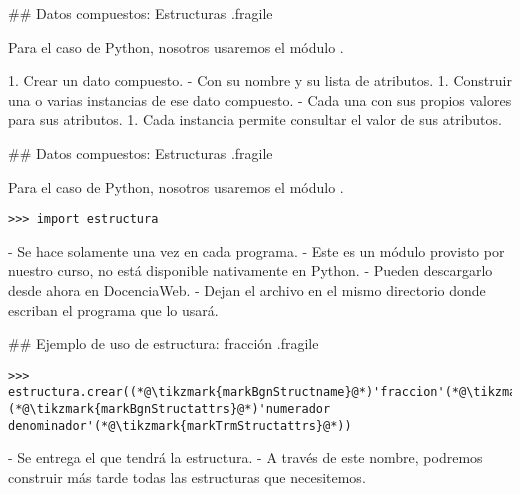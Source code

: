## Datos compuestos: Estructuras {.fragile}

\bgnblockidea
Para el caso de Python, nosotros usaremos el módulo .
\trmblockidea


1. Crear un dato compuesto.
    - Con su nombre y su lista de atributos.
1. Construir una o varias instancias de ese dato compuesto.
    - Cada una con sus propios valores para sus atributos.
1. Cada instancia permite consultar el valor de sus atributos.

## Datos compuestos: Estructuras {.fragile}

\bgnblockidea
Para el caso de Python, nosotros usaremos el módulo .
\trmblockidea


\begin{lstlisting}[style=frame02]
>>> import estructura
\end{lstlisting}

- Se hace solamente una vez en cada programa.
- Este es un módulo provisto por nuestro curso, no está disponible nativamente en Python.
- Pueden descargarlo desde ahora en DocenciaWeb.
- Dejan el archivo  en el mismo directorio donde escriban el programa que lo usará.

## Ejemplo de uso de estructura: fracción {.fragile}


\begin{lstlisting}
>>> estructura.crear((*@\tikzmark{markBgnStructname}@*)'fraccion'(*@\tikzmark{markTrmStructname}@*), (*@\tikzmark{markBgnStructattrs}@*)'numerador denominador'(*@\tikzmark{markTrmStructattrs}@*))
\end{lstlisting}


\vspace{2ex}

\bgncolumns
{}

- Se entrega el  que tendrá la estructura.
    - A través de este nombre, podremos construir más tarde todas las estructuras que necesitemos.


